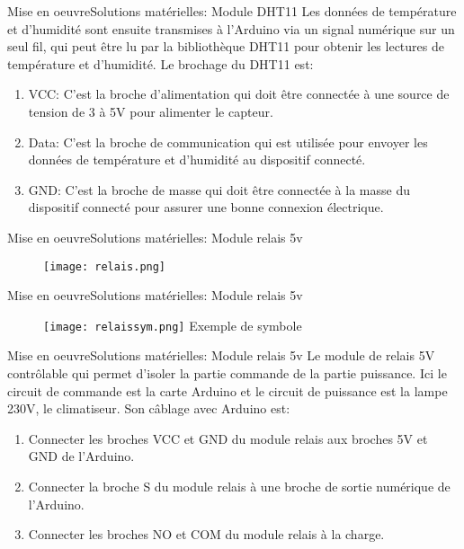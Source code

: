 \documentclass{beamer}
\begin{document}
	\begin{frame}{Mise en oeuvre}{Solutions matérielles: Module DHT11}	
		Les données de température et d'humidité sont ensuite transmises à l'Arduino via un signal numérique sur un seul fil, qui peut être lu par la bibliothèque DHT11 pour obtenir les lectures de température et d'humidité.\vspace{4pt}\linebreak
		Le brochage du DHT11 est:
		\begin{enumerate}
			\item VCC: C'est la broche d'alimentation qui doit être connectée à une source de tension de 3 à 5V pour alimenter le capteur.
			\item  Data: C'est la broche de communication qui est utilisée pour envoyer les données de température et d'humidité au dispositif connecté.
			\item GND: C'est la broche de masse qui doit être connectée à la masse du dispositif connecté pour assurer une bonne connexion électrique.
		\end{enumerate}
	\end{frame}
	
	\begin{frame}{Mise en oeuvre}{Solutions matérielles: Module relais 5v}
		\begin{figure}\centering
			\texttt{[image: relais.png]}
		\end{figure}
	\end{frame}
	\begin{frame}{Mise en oeuvre}{Solutions matérielles: Module relais 5v}
		\begin{figure}\centering
			\texttt{[image: relaissym.png]}
			{Exemple de symbole}
		\end{figure}
	\end{frame}
	
	\begin{frame}{Mise en oeuvre}{Solutions matérielles: Module relais 5v}
		Le module de relais 5V contrôlable qui permet d'isoler la partie commande de la partie puissance. Ici le circuit de commande est la carte Arduino et le circuit de puissance est la lampe 230V, le climatiseur. Son câblage avec Arduino est:
		\begin{enumerate}
			\item Connecter les broches VCC et GND du module relais aux broches 5V et GND de l'Arduino.
			\item Connecter la broche S du module relais à une broche de sortie numérique de l'Arduino.
			\item Connecter les broches NO et COM du module relais à la charge.
		\end{enumerate}
	\end{frame}
	
\end{document}
